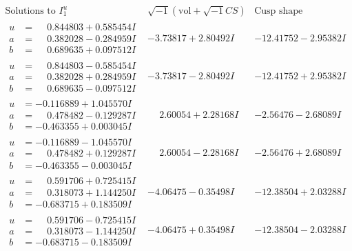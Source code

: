 \documentclass[1p]{elsarticle_modified}
\theoremstyle{definition}
\newcommand{\I}{\sqrt{-1}}
\begin{document}
$$\begin{array}{c|c|c}  
\text{Solutions to }I^u_{1}& \I (\text{vol} + \sqrt{-1}CS) & \text{Cusp shape}\\
 \hline 
\begin{aligned}
u &= \phantom{-}0.844803 + 0.585454 I \\
a &= \phantom{-}0.382028 - 0.284959 I \\
b &= \phantom{-}0.689635 + 0.097512 I\end{aligned}
 & -3.73817 + 2.80492 I & -12.41752 - 2.95382 I \\ \hline\begin{aligned}
u &= \phantom{-}0.844803 - 0.585454 I \\
a &= \phantom{-}0.382028 + 0.284959 I \\
b &= \phantom{-}0.689635 - 0.097512 I\end{aligned}
 & -3.73817 - 2.80492 I & -12.41752 + 2.95382 I \\ \hline\begin{aligned}
u &= -0.116889 + 1.045570 I \\
a &= \phantom{-}0.478482 - 0.129287 I \\
b &= -0.463355 + 0.003045 I\end{aligned}
 & \phantom{-}2.60054 + 2.28168 I & -2.56476 - 2.68089 I \\ \hline\begin{aligned}
u &= -0.116889 - 1.045570 I \\
a &= \phantom{-}0.478482 + 0.129287 I \\
b &= -0.463355 - 0.003045 I\end{aligned}
 & \phantom{-}2.60054 - 2.28168 I & -2.56476 + 2.68089 I \\ \hline\begin{aligned}
u &= \phantom{-}0.591706 + 0.725415 I \\
a &= \phantom{-}0.318073 + 1.144250 I \\
b &= -0.683715 + 0.183509 I\end{aligned}
 & -4.06475 - 0.35498 I & -12.38504 + 2.03288 I \\ \hline\begin{aligned}
u &= \phantom{-}0.591706 - 0.725415 I \\
a &= \phantom{-}0.318073 - 1.144250 I \\
b &= -0.683715 - 0.183509 I\end{aligned}
 & -4.06475 + 0.35498 I & -12.38504 - 2.03288 I \\ \hline\begin{aligned}

\end{aligned}
\end{array}$$
\end{document}
